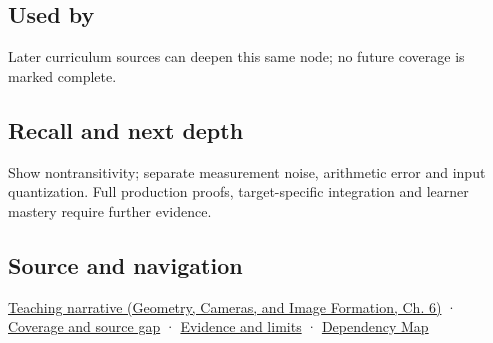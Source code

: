 \subsection{Used by}\label{appendix-b5b83329215b-used-by}

Later curriculum sources can deepen this same node; no future coverage is marked complete.

\subsection{Recall and next depth}\label{appendix-b5b83329215b-recall-and-next-depth}

Show nontransitivity; separate measurement noise, arithmetic error and input quantization. Full production proofs, target-specific integration and learner mastery require further evidence.

\subsection{Source and navigation}\label{appendix-b5b83329215b-source-and-navigation}

\href{../03-Geometry-Cameras-and-Image-Formation/main.pdf\#nameddest=02-foundations-ii-ch037-reliability-begins-at-the-boundary-of-the-calculation}{Teaching narrative (Geometry, Cameras, and Image Formation, Ch. 6)} · \hyperref[appendix-fd090d982a15-phase-6---parts-501-600]{Coverage and source gap} · \hyperref[appendix-a103e7846d21-phase-6---source-analysis-and-verification]{Evidence and limits} · \hyperref[appendix-4ad47bdd269a]{Dependency Map}
